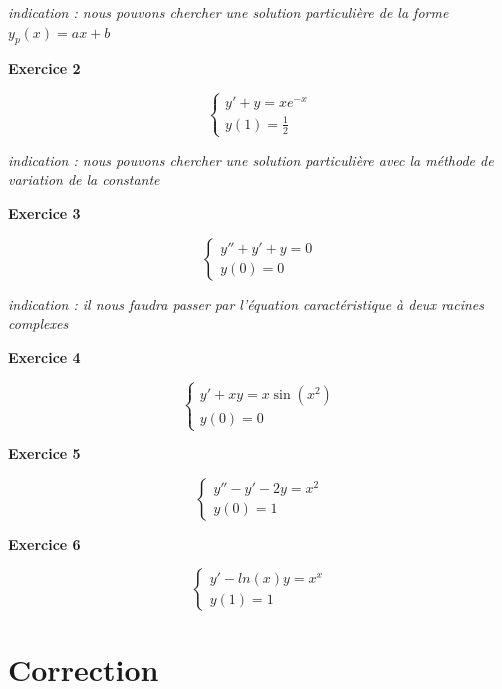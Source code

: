 \documentclass{article}
\newcommand{\exo}[1]{
    \vspace{5mm}
    \textbf{Exercice #1}
    \hrulefill
}
\begin{document}
\scriptsize
\textit{indication : nous pouvons chercher une solution particulière de la forme $y_p(x) = ax+b$}
\normalsize


\exo{2}

\begin{equation*}
\begin{cases}
y' + y = xe^{-x}\\
y(1)=\frac{1}{2}
\end{cases}
\end{equation*}

\scriptsize
\textit{indication : nous pouvons chercher une solution particulière avec la méthode de variation de la constante}
\normalsize


\exo{3}

\begin{equation*}
\begin{cases}
    y'' + y' + y = 0  \\
    y(0)=0
\end{cases}
\end{equation*}

\scriptsize
\textit{indication : il nous faudra passer par l'équation caractéristique à deux racines complexes}
\normalsize

\exo{4}

\begin{equation*}
\begin{cases}
    y' + xy = x\sin(x^2) \\
    y(0)=0
\end{cases}
\end{equation*}

\exo{5}

\begin{equation*}
\begin{cases}
    y'' - y' - 2y = x^2 \\
    y(0)=1
\end{cases}
\end{equation*}

\exo{6}

\begin{equation*}
\begin{cases}
    y' - ln(x)y = x^x \\
    y(1) = 1
\end{cases}
\end{equation*}


\section{Correction}
\end{document}
